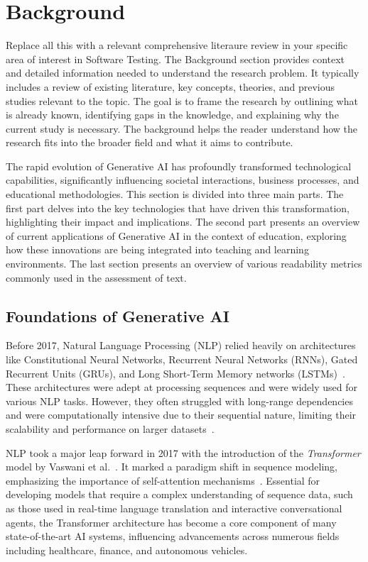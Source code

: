\section{Background}
\label{Background}

Replace all this with a relevant comprehensive literaure review in your specific area of interest in Software Testing.  The Background section provides context and detailed information needed to understand the research problem. It typically includes a review of existing literature, key concepts, theories, and previous studies relevant to the topic. The goal is to frame the research by outlining what is already known, identifying gaps in the knowledge, and explaining why the current study is necessary. The background helps the reader understand how the research fits into the broader field and what it aims to contribute. 

The rapid evolution of Generative AI has profoundly transformed technological capabilities, significantly influencing societal interactions, business processes, and educational methodologies. This section is divided into three main parts. The first part delves into the key technologies that have driven this transformation, highlighting their impact and implications. The second part presents an overview of current applications of Generative AI in the context of education, exploring how these innovations are being integrated into teaching and learning environments. The last section presents an overview of various readability metrics commonly used in the assessment of text.

\subsection{Foundations of Generative AI}
Before 2017, Natural Language Processing (NLP) relied heavily on architectures like Constitutional Neural Networks, Recurrent Neural Networks (RNNs), Gated Recurrent Units (GRUs), and Long Short-Term Memory networks (LSTMs)~\cite{sherstinsky_2020_fundamentals}. These architectures were adept at processing sequences and were widely used for various NLP tasks. However, they often struggled with long-range dependencies and were computationally intensive due to their sequential nature, limiting their scalability and performance on larger datasets~\cite{sherstinsky_2020_fundamentals}.

NLP took a major leap forward in 2017 with the introduction of the \textit{Transformer} model by Vaswani et al.~\cite{vaswani2017_Attention}. It marked a paradigm shift in sequence modeling, emphasizing the importance of self-attention mechanisms~\cite{vaswani2017_Attention}. Essential for developing models that require a complex understanding of sequence data, such as those used in real-time language translation and interactive conversational agents, the Transformer architecture has become a core component of many state-of-the-art AI systems, influencing advancements across numerous fields including healthcare, finance, and autonomous vehicles.

